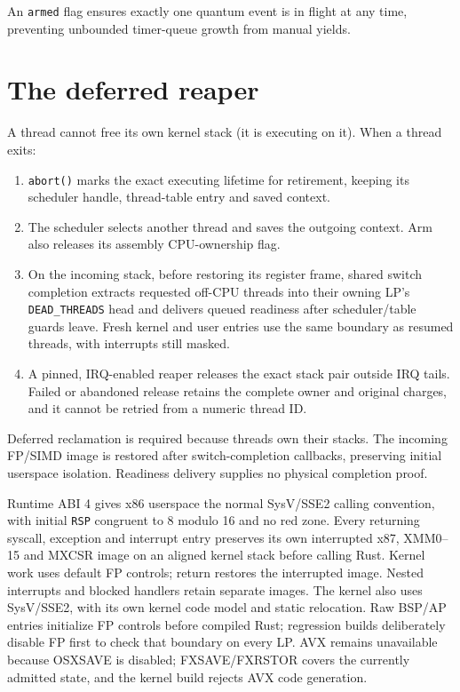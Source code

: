 An \texttt{armed} flag ensures exactly one quantum event is in flight at any time,
preventing unbounded timer-queue growth from manual yields.

\section{The deferred reaper}

A thread cannot free its own kernel stack (it is executing on it). When a thread
exits:

\begin{enumerate}
    \item \texttt{abort()} marks the exact executing lifetime for retirement,
        keeping its scheduler handle, thread-table entry and saved context.
    \item The scheduler selects another thread and saves the outgoing context.
        Arm also releases its assembly CPU-ownership flag.
    \item On the incoming stack, before restoring its register frame, shared
        switch completion extracts requested off-CPU threads into their owning
        LP's \texttt{DEAD\_THREADS} head and delivers queued readiness after
        scheduler/table guards leave. Fresh kernel and user entries use the
        same boundary as resumed threads, with interrupts still masked.
    \item A pinned, IRQ-enabled reaper releases the exact stack pair outside
        IRQ tails. Failed or abandoned release retains the complete owner and
        original charges, and it cannot be retried from a numeric thread ID.
\end{enumerate}

Deferred reclamation is required because threads own their stacks. The incoming
FP/SIMD image is restored after switch-completion callbacks, preserving initial
userspace isolation. Readiness delivery supplies no physical completion proof.

Runtime ABI 4 gives x86 userspace the normal SysV/SSE2 calling convention,
with initial \texttt{RSP} congruent to 8 modulo 16 and no red zone. Every
returning syscall, exception and interrupt entry preserves its own interrupted
x87, XMM0--15 and MXCSR image on an aligned kernel stack before calling Rust.
Kernel work uses default FP controls; return restores the interrupted image.
Nested interrupts and blocked handlers retain separate images. The kernel
also uses SysV/SSE2, with its own kernel code model and static relocation.
Raw BSP/AP entries initialize FP controls before compiled Rust; regression
builds deliberately disable FP first to check that boundary on every LP.
AVX remains unavailable because OSXSAVE is disabled; FXSAVE/FXRSTOR covers
the currently admitted state, and the kernel build rejects AVX code generation.


